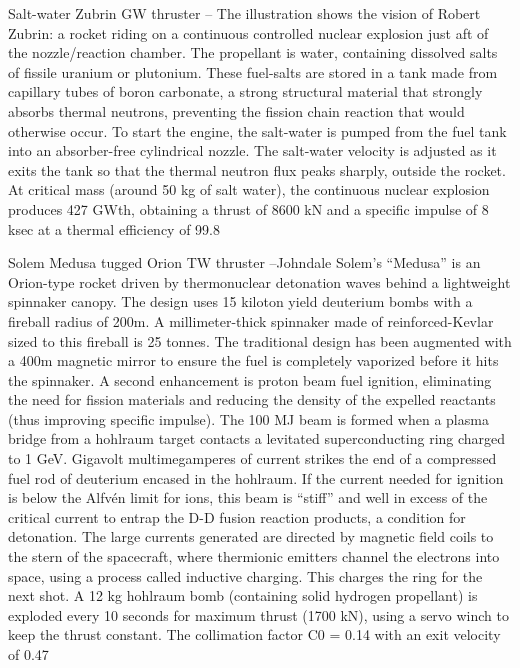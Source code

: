 \documentclass[a4paper]{book}
\begin{document}
Salt-water Zubrin GW thruster – The illustration shows the vision of Robert Zubrin: a rocket riding on a continuous controlled nuclear explosion just aft of the nozzle/reaction chamber.  The propellant is water, containing dissolved salts of fissile uranium or plutonium. These fuel-salts are stored in a tank made from capillary tubes of boron carbonate, a strong structural material that strongly absorbs thermal neutrons, preventing the fission chain reaction that would otherwise occur. To start the engine, the salt-water is pumped from the fuel tank into an absorber-free cylindrical nozzle.  The salt-water velocity is adjusted as it exits the tank so that the thermal neutron flux peaks sharply, outside the rocket.  At critical mass (around 50 kg of salt water), the continuous nuclear explosion produces 427 GWth, obtaining a thrust of 8600 kN and a specific impulse of 8 ksec at a thermal efficiency of 99.8%
 
Solem Medusa tugged Orion TW thruster –Johndale Solem’s “Medusa” is an Orion-type rocket driven by thermonuclear detonation waves behind a lightweight spinnaker canopy. The design uses 15 kiloton yield deuterium bombs with a fireball radius of 200m. A millimeter-thick spinnaker made of reinforced-Kevlar sized to this fireball is 25 tonnes. The traditional design has been augmented with a 400m magnetic mirror to ensure the fuel is completely vaporized before it hits the spinnaker. A second enhancement is proton beam fuel ignition, eliminating the need for fission materials and reducing the density of the expelled reactants (thus improving specific impulse). The 100 MJ beam is formed when a plasma bridge from a hohlraum target contacts a levitated superconducting ring charged to 1 GeV. Gigavolt multimegamperes of current strikes the end of a compressed fuel rod of deuterium encased in the hohlraum. If the current needed for ignition is below the Alfvén limit for ions, this beam is “stiff” and well in excess of the critical current to entrap the D-D fusion reaction products, a condition for detonation. The large currents generated are directed by magnetic field coils to the stern of the spacecraft, where thermionic emitters channel the electrons into space, using a process called inductive charging. This charges the ring for the next shot. A 12 kg hohlraum bomb (containing solid hydrogen propellant) is exploded every 10 seconds for maximum thrust (1700 kN), using a servo winch to keep the thrust constant. The collimation factor C0 = 0.14 with an exit velocity of 0.47%
 
\end{document}
